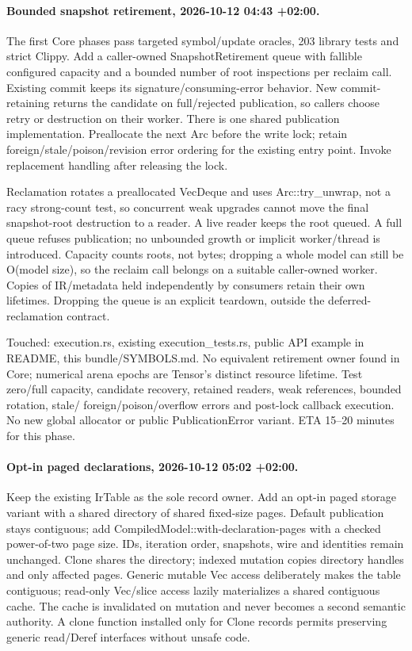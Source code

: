 \documentclass[11pt,a4paper]{article}
\begin{document}
\paragraph{Bounded snapshot retirement, 2026-10-12 04:43 +02:00.}
The first Core phases pass targeted symbol/update oracles, 203 library tests and
strict Clippy. Add a caller-owned SnapshotRetirement queue with fallible configured
capacity and a bounded number of root inspections per reclaim call. Existing
commit keeps its signature/consuming-error behavior. New commit-retaining returns
the candidate on full/rejected publication, so callers choose retry or destruction
on their worker. There is one shared publication implementation. Preallocate the
next Arc before the write lock; retain foreign/stale/poison/revision error ordering
for the existing entry point. Invoke replacement handling after releasing the lock.

Reclamation rotates a preallocated VecDeque and uses Arc::try\_unwrap, not a racy
strong-count test, so concurrent weak upgrades cannot move the final snapshot-root
destruction to a reader. A live reader keeps the root queued. A full queue refuses
publication; no unbounded growth or implicit worker/thread is introduced. Capacity
counts roots, not bytes; dropping a whole model can still be O(model size), so the
reclaim call belongs on a suitable caller-owned worker. Copies of IR/metadata held
independently by consumers retain their own lifetimes. Dropping the queue is an
explicit teardown, outside the deferred-reclamation contract.

Touched: execution.rs, existing execution\_tests.rs, public API example in README,
this bundle/SYMBOLS.md. No equivalent retirement owner found in Core; numerical
arena epochs are Tensor's distinct resource lifetime. Test zero/full capacity,
candidate recovery, retained readers, weak references, bounded rotation, stale/
foreign/poison/overflow errors and post-lock callback execution. No new global
allocator or public PublicationError variant. ETA 15--20 minutes for this phase.

\paragraph{Opt-in paged declarations, 2026-10-12 05:02 +02:00.}
Keep the existing IrTable as the sole record owner. Add an opt-in paged storage
variant with a shared directory of shared fixed-size pages. Default publication
stays contiguous; add CompiledModel::with-declaration-pages with a checked
power-of-two page size. IDs, iteration order, snapshots, wire and identities
remain unchanged. Clone shares the directory; indexed mutation copies directory
handles and only affected pages. Generic mutable Vec access deliberately makes
the table contiguous; read-only Vec/slice access lazily materializes a shared
contiguous cache. The cache is invalidated on mutation and never becomes a
second semantic authority. A clone function installed only for Clone records
permits preserving generic read/Deref interfaces without unsafe code.
\end{document}
